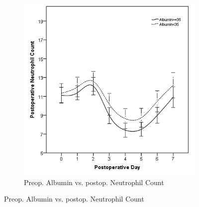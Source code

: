 \begin{figure}[p]
	\vspace{1cm}
	
	\begin{subfigure}{0.48\textwidth}
		\centering
		\includegraphics[width=\textwidth]{Figures/sirs_alb_neut}
		\caption{Preop. Albumin vs. postop. Neutrophil Count}
		\label{fig:sirs_alb_neut}
	\end{subfigure}	
\end{figure}

